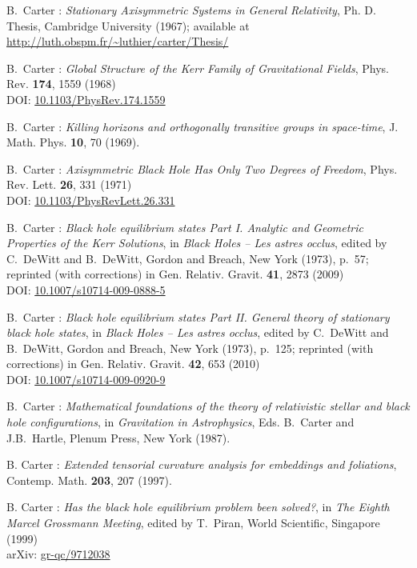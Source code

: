 \begin{thebibliography}{123}
B.~Carter : {\em Stationary Axisymmetric Systems in General Relativity},
Ph. D. Thesis, Cambridge University (1967); available at\\
\url{http://luth.obspm.fr/~luthier/carter/Thesis/}

B.~Carter :
{\em Global Structure of the Kerr Family of Gravitational Fields},
Phys. Rev. {\bf 174}, 1559 (1968)\\
DOI: \href{https://doi.org/10.1103/PhysRev.174.1559}{10.1103/PhysRev.174.1559}

B.~Carter : {\em Killing horizons and orthogonally transitive groups
in space-time},
J. Math. Phys. {\bf 10}, 70 (1969).

B.~Carter : {\em Axisymmetric Black Hole Has Only Two Degrees of Freedom},
Phys. Rev. Lett. {\bf 26}, 331 (1971)\\
DOI: \href{https://doi.org/10.1103/PhysRevLett.26.331}{10.1103/PhysRevLett.26.331}

B.~Carter : {\em Black hole equilibrium states Part I.
Analytic and Geometric Properties of the Kerr Solutions},
in {\em Black Holes -- Les astres occlus},  edited by C.~DeWitt and B.~DeWitt,
Gordon and Breach, New York (1973), p.~57; reprinted (with corrections) in
Gen. Relativ. Gravit. {\bf 41}, 2873 (2009)\\
DOI: \href{https://doi.org/10.1007/s10714-009-0888-5}{10.1007/s10714-009-0888-5}

B.~Carter : {\em Black hole equilibrium states Part II. General theory of stationary black hole states}, in {\em Black Holes -- Les astres occlus},  edited by C.~DeWitt and B.~DeWitt,
Gordon and Breach, New York (1973), p.~125; reprinted (with corrections) in
Gen. Relativ. Gravit. {\bf 42}, 653 (2010)\\
DOI: \href{https://doi.org/10.1007/s10714-009-0920-9}{10.1007/s10714-009-0920-9}

B.~Carter : {\em Mathematical foundations of the theory of
relativistic stellar and black hole configurations},
in {\em Gravitation in Astrophysics}, Eds. B.~Carter and J.B.~Hartle,
Plenum Press, New York (1987).

B. Carter : {\em Extended tensorial curvature analysis for embeddings
and foliations},
Contemp. Math. {\bf 203}, 207 (1997).

B. Carter : {\em Has the black hole equilibrium problem been solved?},
in {\em The Eighth Marcel Grossmann Meeting}, edited by T.~Piran,
World Scientific, Singapore (1999)\\
arXiv: \href{https://arxiv.org/abs/gr-qc/9712038}{gr-qc/9712038}


\end{thebibliography}

